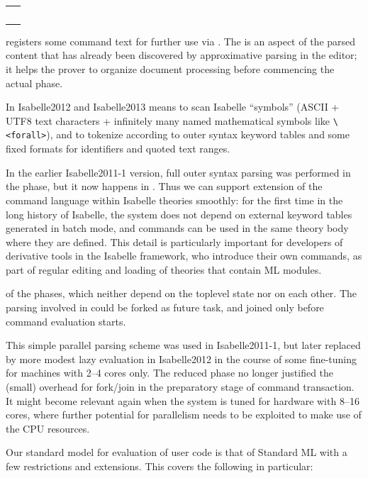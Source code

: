 \begin{isabellebody}
\begin{isamarkuptext}
  \medskip
  \begin{tabular}{l}
  \isa{Document{\isachardot}define{\isacharunderscore}command{\isacharcolon}\ id\ {\isasymrightarrow}\ string\ {\isasymrightarrow}\ string\ {\isasymrightarrow}\ Document{\isachardot}state\ {\isasymrightarrow}\ Document{\isachardot}state} \
  \end{tabular}
  \medskip

  \noindent {} registers
  some command \isa{src} text for further use via \isa{id}.  The
  \isa{name} is an aspect of the parsed content that has already
  been discovered by approximative parsing in the editor; it helps the
  prover to organize document processing before commencing the actual
  \isa{read} phase.

  \medskip In Isabelle2012 and Isabelle2013  means to scan
  Isabelle ``symbols'' (ASCII + UTF8 text characters + infinitely many
  named mathematical symbols like \verb,\<forall>,), and to tokenize according
  to outer syntax keyword tables and some fixed formats for
  identifiers and quoted text ranges.

  In the earlier Isabelle2011-1 version, full outer syntax parsing was
  performed in the \isa{read} phase, but it now happens in \isa{eval}.  Thus we can support extension of the command language within
  Isabelle theories smoothly: for the first time in the long history
  of Isabelle, the system does not depend on external keyword tables
  generated in batch mode, and commands can be used in the same theory
  body where they are defined.  This detail is particularly important
  for developers of derivative tools in the Isabelle framework, who
  introduce their own commands, as part of regular editing and loading
  of theories that contain ML modules.

   of the  phases, which neither
  depend on the toplevel state nor on each other.  The parsing
  involved in  could be forked as
  future task, and joined only before command evaluation starts.

  This simple parallel parsing scheme was used in Isabelle2011-1, but
  later replaced by more modest lazy evaluation in Isabelle2012 in the
  course of some fine-tuning for machines with 2--4 cores only.  The
  reduced \isa{read} phase no longer justified the (small) overhead
  for fork/join in the preparatory stage of command transaction.  It
  might become relevant again when the system is tuned for hardware
  with 8--16 cores, where further potential for parallelism needs to
  be exploited to make use of the CPU resources.%
\end{isamarkuptext}%
\isamarkuptrue%
%
\isamarkupsubsection{Managed Evaluation (EVAL) \label{sec:eval}%
}
\isamarkuptrue%
%
\begin{isamarkuptext}%
Our standard model for evaluation of user code is that of
  Standard ML with a few restrictions and extensions.  This covers the
  following in particular:


\end{isamarkuptext}
\end{isabellebody}

